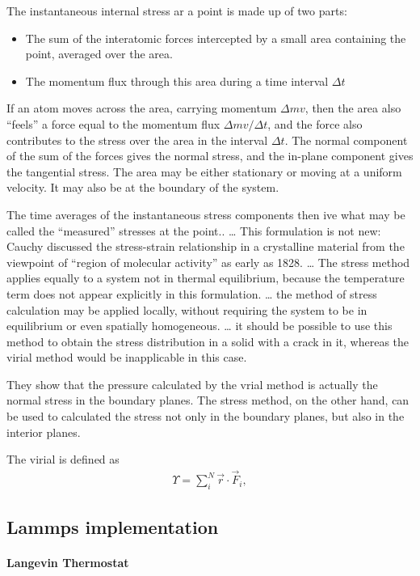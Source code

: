 \documentclass[../../main-notes.tex]{subfiles}
\begin{document}
The instantaneous internal stress ar a point is made up of two parts:
\begin{itemize}
    \item The sum of the interatomic forces intercepted by a small area containing the point, averaged over the area.
    \item The momentum flux through this area during a time interval $\Delta t$
\end{itemize}
If an atom moves across the area, carrying momentum $\Delta mv$, then the area also ``feels'' a force equal to the momentum flux $\Delta mv/\Delta t$, and the force also contributes to the stress over the area in the interval $\Delta t$.
The normal component of the sum of the forces gives the normal stress, and the in-plane component gives the tangential stress.
The area may be either stationary or moving at a uniform velocity.
It may also be at the boundary of the system.

The time averages of the instantaneous stress components then ive what may be called the ``measured'' stresses at the point.\citep{Tsai_1979}.
\ldots
This formulation is not new: Cauchy discussed the stress-strain relationship in a crystalline material from the viewpoint of ``region of molecular activity'' as early as 1828.
\ldots
The stress method applies equally to a system not in thermal equilibrium, because the temperature term does not appear explicitly in this formulation.
\ldots
the method of stress calculation may be applied locally, without requiring the system to be in equilibrium or even spatially homogeneous.
\ldots
it should be possible to use this method to obtain the stress distribution in a solid with a crack in it, whereas the virial method would be inapplicable in this case.

They show that the pressure calculated by the vrial method is actually the normal stress in the boundary planes.
The stress method, on the other hand, can be used to calculated the stress not only in the boundary planes, but also in the interior planes.

The virial is defined as 
\begin{gather}
    \Upsilon=\sum_i^N \vec{r}\cdot\vec{F}_i,
\end{gather}


\subsection{Lammps implementation}

\paragraph{Langevin Thermostat}
\end{document}
